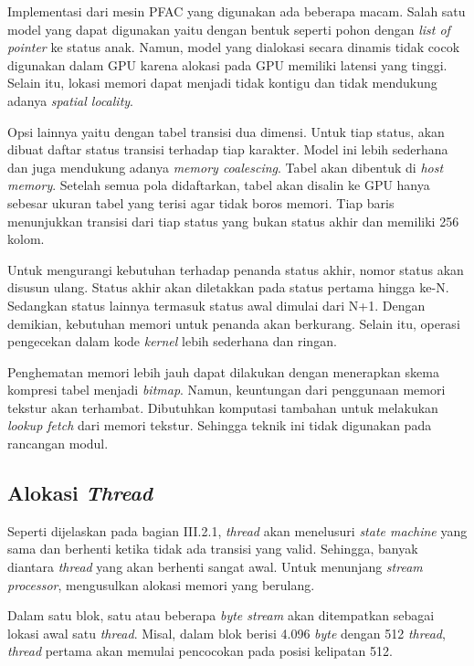       Implementasi dari mesin PFAC yang digunakan ada beberapa macam. Salah satu model yang dapat digunakan yaitu dengan bentuk seperti pohon dengan \emph{list of pointer} ke status anak. Namun, model yang dialokasi secara dinamis tidak cocok digunakan dalam GPU karena alokasi pada GPU memiliki latensi yang tinggi. Selain itu, lokasi memori dapat menjadi tidak kontigu dan tidak mendukung adanya \emph{spatial locality}.
      
      Opsi lainnya yaitu dengan tabel transisi dua dimensi. Untuk tiap status, akan dibuat daftar status transisi terhadap tiap karakter. Model ini lebih sederhana dan juga mendukung adanya \emph{memory coalescing}. Tabel akan dibentuk di \emph{host memory}. Setelah semua pola didaftarkan, tabel akan disalin ke GPU hanya sebesar ukuran tabel yang terisi agar tidak boros memori. Tiap baris menunjukkan transisi dari tiap status yang bukan status akhir dan memiliki 256 kolom.

      Untuk mengurangi kebutuhan terhadap penanda status akhir, nomor status akan disusun ulang. Status akhir akan diletakkan pada status pertama hingga ke-N. Sedangkan status lainnya termasuk status awal dimulai dari N+1. Dengan demikian, kebutuhan memori untuk penanda akan berkurang. Selain itu, operasi pengecekan dalam kode \emph{kernel} lebih sederhana dan ringan.

      Penghematan memori lebih jauh dapat dilakukan dengan menerapkan skema kompresi tabel menjadi \emph{bitmap}. Namun, keuntungan dari penggunaan memori tekstur akan terhambat. Dibutuhkan komputasi tambahan untuk melakukan \emph{lookup fetch} dari memori tekstur. Sehingga teknik ini tidak digunakan pada rancangan modul.

      \subsection{Alokasi \emph{Thread}}

      Seperti dijelaskan pada bagian III.2.1, \emph{thread} akan menelusuri \emph{state machine} yang sama dan berhenti ketika tidak ada transisi yang valid. Sehingga, banyak diantara \emph{thread} yang akan berhenti sangat awal. Untuk menunjang \emph{stream processor}, \cite{lin2013} mengusulkan alokasi memori yang berulang.

      Dalam satu blok, satu atau beberapa \emph{byte stream} akan ditempatkan sebagai lokasi awal satu \emph{thread}. Misal, dalam blok berisi 4.096 \emph{byte} dengan 512 \emph{thread}, \emph{thread} pertama akan memulai pencocokan pada posisi kelipatan 512. 

